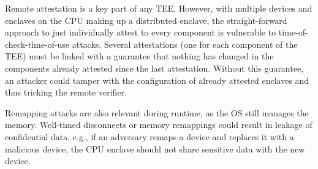 Remote attestation is a key part of any TEE. However, with multiple \sphw devices and enclaves on the CPU making up a distributed enclave, the straight-forward approach to just individually attest to every component is vulnerable to time-of-check-time-of-use attacks. Several attestations (one for each component of the TEE) must be linked with a guarantee that nothing has changed in the components already attested since the last attestation. Without this guarantee, an attacker could tamper with the configuration of already attested enclaves and thus tricking the remote verifier.

Remapping attacks are also relevant during runtime, as the OS still manages the memory. Well-timed disconnects or memory remappings could result in leakage of confidential data, e.g., if an adversary remaps a \sphw device and replaces it with a malicious device, the CPU enclave should not share sensitive data with the new device. 

